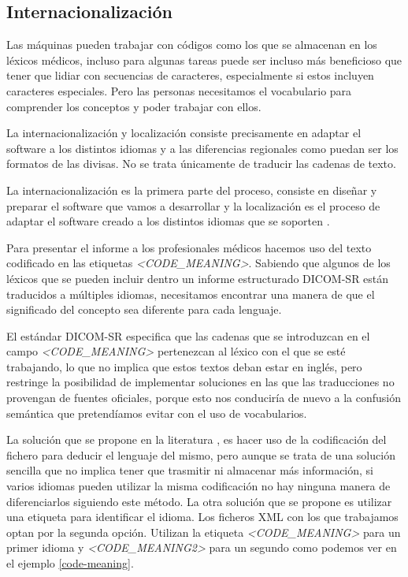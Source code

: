 \subsection{Internacionalización}\label{dicomsr:internacionalizacion}
Las máquinas pueden trabajar con códigos como los que se almacenan en los léxicos médicos, incluso para algunas tareas puede ser incluso más beneficioso que tener que lidiar con secuencias de caracteres, especialmente si estos incluyen caracteres especiales. Pero las personas necesitamos el vocabulario para comprender los conceptos y poder trabajar con ellos.\medskip \par

La internacionalización y localización consiste precisamente en adaptar el software a los distintos idiomas y a las diferencias regionales como puedan ser los formatos de las divisas. No se trata únicamente de traducir las cadenas de texto.\par 
La internacionalización es la primera parte del proceso, consiste en diseñar y preparar el software que vamos a desarrollar y la localización es el proceso de adaptar el software creado a los distintos idiomas que se soporten \cite{Uren:1993:ISI:562752}. \medskip\par

Para presentar el informe a los profesionales médicos hacemos uso del texto codificado en las etiquetas \emph{<CODE\_MEANING>}. Sabiendo que algunos de los léxicos que se pueden incluir dentro un informe estructurado DICOM-SR están traducidos a múltiples idiomas, necesitamos encontrar una manera de que el significado del concepto sea diferente para cada lenguaje.\par
El estándar DICOM-SR especifica que las cadenas que se introduzcan en el campo \emph{<CODE\_MEANING>} pertenezcan al léxico con el que se esté trabajando, lo que no implica que estos textos deban estar en inglés, pero restringe la posibilidad de implementar soluciones en las que las traducciones no provengan de fuentes oficiales, porque esto nos conduciría de nuevo a la confusión semántica que pretendíamos evitar con el uso de vocabularios.\par
La solución que se propone en la literatura \cite{clunie2000dicom}, es hacer uso de la codificación del fichero para deducir el lenguaje del mismo, pero aunque se trata de una solución sencilla que no implica tener que trasmitir ni almacenar más información, si varios idiomas pueden utilizar la misma codificación no hay ninguna manera de diferenciarlos siguiendo este método. La otra solución que se propone es utilizar una etiqueta para identificar el idioma. Los ficheros XML con los que trabajamos optan por la segunda opción. Utilizan la etiqueta \emph{<CODE\_MEANING>} para un primer idioma y \emph{<CODE\_MEANING2>} para un segundo como podemos ver en el ejemplo \ref{code-meaning}.\par


